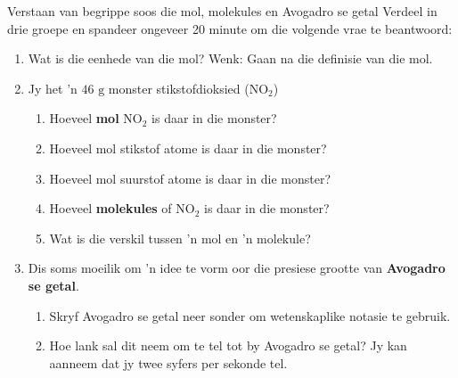             \begin{groupdiscussion}{Verstaan van begrippe soos die mol, molekules en Avogadro se getal
      }
            \nopagebreak
      \label{m38717*id279596}Verdeel in drie groepe en spandeer ongeveer 20 minute om die volgende vrae te beantwoord:
      \label{m38717*id279603}\begin{enumerate}[noitemsep, label=\textbf{\arabic*}. ] 
            \label{m38717*uid39}\item Wat is die eenhede van die mol? Wenk: Gaan na die definisie van die mol.
\label{m38717*uid40}\item Jy het 'n $46 \text{ g}$ monster stikstofdioksied ($\text{NO}_{2}$)
\label{m38717*id279631}\begin{enumerate}[noitemsep, label=\textbf{\alph*}. ] 
\item Hoeveel \textbf{mol} $\text{NO}_{2}$ is daar in die monster?
\item Hoeveel mol stikstof atome is daar in die monster?
\item Hoeveel mol suurstof atome is daar in die monster?
\item Hoeveel \textbf{molekules} of $\text{NO}_{2}$ is daar in die monster?
\item Wat is die verskil tussen 'n mol en 'n molekule?
\end{enumerate}
        \label{m38717*uid44}\item Dis soms moeilik om  'n idee te vorm oor die presiese grootte van \textbf{Avogadro se getal}.
\label{m38717*id279703}\begin{enumerate}[noitemsep, label=\textbf{\alph*}. ] 
            \label{m38717*uid45}\item Skryf Avogadro se getal neer sonder om wetenskaplike notasie te gebruik.
\label{m38717*uid46}\item Hoe lank sal dit neem om te tel tot by Avogadro se getal? Jy kan aanneem
              dat jy twee syfers per sekonde tel.
\end{enumerate}
        \end{enumerate}
\end{groupdiscussion}


